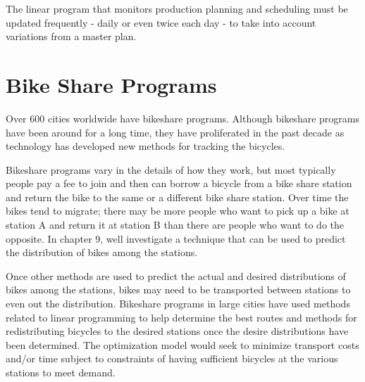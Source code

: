 The linear program that monitors production planning and scheduling must be updated frequently - daily or even twice each day - to take into account variations from a master plan.

\section*{Bike Share Programs}

Over 600 cities worldwide have bikeshare programs. Although bikeshare programs have been around for a long time, they have proliferated in the past decade as technology has developed new methods for tracking the bicycles.

Bikeshare programs vary in the details of how they work, but most typically people pay a fee to join and then can borrow a bicycle from a bike share station and return the bike to the same or a different bike share station. Over time the bikes tend to migrate; there may be more people who want to pick up a bike at station A and return it at station B than there are people who want to do the opposite. In chapter 9, well investigate a technique that can be used to predict the distribution of bikes among the stations.

Once other methods are used to predict the actual and desired distributions of bikes among the stations, bikes may need to be transported between stations to even out the distribution. Bikeshare programs in large cities have used methods related to linear programming to help determine the best routes and methods for redistributing bicycles to the desired stations once the desire distributions have been determined. The optimization model would seek to minimize transport costs and/or time subject to constraints of having sufficient bicycles at the various stations to meet demand.


